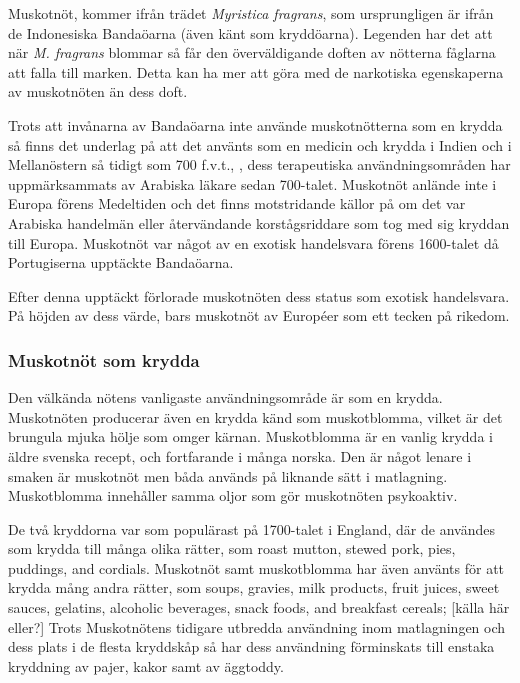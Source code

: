 Muskotnöt, kommer ifrån trädet \textit{Myristica fragrans}, som ursprungligen är ifrån de Indonesiska Bandaöarna (även känt som kryddöarna). Legenden har det att när \textit{M. fragrans} blommar så får den överväldigande doften av nötterna fåglarna att falla till marken. \cite{kreig1965green}
Detta kan ha mer att göra med de narkotiska egenskaperna av muskotnöten än dess doft.

Trots att invånarna av Bandaöarna inte använde muskotnötterna som en krydda så finns det underlag på att det använts som en medicin och krydda i Indien och i Mellanöstern så tidigt som 700 f.v.t., \cite{kalbhen1971nutmeg}, dess terapeutiska användningsområden har uppmärksammats av Arabiska läkare sedan 700-talet. \cite{weil1967nutmeg} Muskotnöt anlände inte i Europa förens Medeltiden och det finns motstridande källor på om det var Arabiska handelmän eller återvändande korstågsriddare som tog med sig kryddan till Europa. Muskotnöt var något av en exotisk handelsvara förens 1600-talet då Portugiserna upptäckte Bandaöarna.

Efter denna upptäckt förlorade muskotnöten dess status som exotisk handelsvara. På höjden av dess värde, bars muskotnöt av Européer som ett tecken på rikedom.

\subsubsection{Muskotnöt som krydda}
Den välkända nötens vanligaste användningsområde är som en krydda. Muskotnöten producerar även en krydda känd som muskotblomma, vilket är det brungula mjuka hölje som omger kärnan. Muskotblomma är en vanlig krydda i äldre svenska recept, och fortfarande i många norska. Den är något lenare i smaken är muskotnöt men båda används på liknande sätt i matlagning. Muskotblomma innehåller samma oljor som gör muskotnöten psykoaktiv. \cite{entheogenreview}

De två kryddorna var som populärast på 1700-talet i England, där de användes som krydda till många olika rätter, som
roast mutton, stewed pork, pies, puddings, and cordials. Muskotnöt samt muskotblomma
har även använts för att krydda mång andra rätter, som soups, gravies, milk products, fruit juices,
sweet sauces, gelatins, alcoholic beverages, snack foods, and breakfast cereals; [källa här eller?]
Trots Muskotnötens tidigare utbredda användning inom matlagningen och dess plats i de flesta kryddskåp så har dess användning förminskats till enstaka kryddning av pajer, kakor samt av äggtoddy. \cite{entheogenreview}


